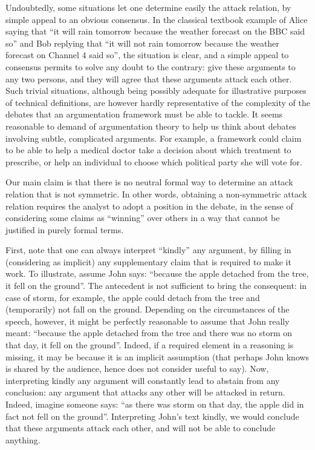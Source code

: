 \documentclass[version=3.21, pagesize, twoside=off, bibliography=totoc, DIV=calc, fontsize=12pt, a4paper, french, english]{scrartcl}
\begin{document}
Undoubtedly, some situations let one determine easily the attack relation, by simple appeal to an obvious consensus. In the classical textbook example of Alice saying that “it will rain tomorrow because the weather forecast on the BBC said so” and Bob replying that “it will not rain tomorrow because the weather forecast on Channel 4 said so”, the situation is clear, and a simple appeal to consensus permits to solve any doubt to the contrary: give these arguments to any two persons, and they will agree that these arguments attack each other. Such trivial situations, although being possibly adequate for illustrative purposes of technical definitions, are however hardly representative of the complexity of the debates that an argumentation framework must be able to tackle. It seems reasonable to demand of argumentation theory to help us think about debates involving subtle, complicated arguments. For example, a framework could claim to be able to help a medical doctor take a decision about which treatment to prescribe, or help an individual to choose which political party she will vote for.

Our main claim is that there is no neutral formal way to determine an attack relation that is not symmetric. In other words, obtaining a non-symmetric attack relation requires the analyst to adopt a position in the debate, in the sense of considering some claims as “winning” over others in a way that cannot be justified in purely formal terms.

First, note that one can always interpret “kindly” any argument, by filling in (considering as implicit) any supplementary claim that is required to make it work. To illustrate, assume John says: “because the apple detached from the tree, it fell on the ground”. The antecedent is not sufficient to bring the consequent: in case of storm, for example, the apple could detach from the tree and (temporarily) not fall on the ground. Depending on the circumstances of the speech, however, it might be perfectly reasonable to assume that John really meant: “because the apple detached from the tree and there was no storm on that day, it fell on the ground”. Indeed, if a required element in a reasoning is missing, it may be because it is an implicit assumption (that perhaps John knows is shared by the audience, hence does not consider useful to say). Now, interpreting kindly any argument will constantly lead to abstain from any conclusion: any argument that attacks any other will be attacked in return. Indeed, imagine someone says: “as there was storm on that day, the apple did in fact not fell on the ground”. Interpreting John’s text kindly, we would conclude that these arguments attack each other, and will not be able to conclude anything.
\end{document}
